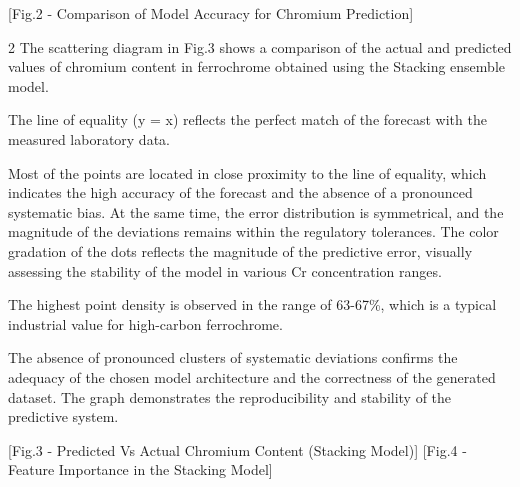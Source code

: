 [Fig.2 - Comparison of Model Accuracy for Chromium Prediction]

\begin{multicols}{2}
The scattering diagram in Fig.3 shows a comparison of the actual and
predicted values of chromium content in ferrochrome obtained using the
Stacking ensemble model.

The line of equality (y = x) reflects the perfect match of the forecast
with the measured laboratory data.

Most of the points are located in close proximity to the line of
equality, which indicates the high accuracy of the forecast and the
absence of a pronounced systematic bias. At the same time, the error
distribution is symmetrical, and the magnitude of the deviations remains
within the regulatory tolerances. The color gradation of the dots
reflects the magnitude of the predictive error, visually assessing the
stability of the model in various Cr concentration ranges.

The highest point density is observed in the range of 63-67\%, which is
a typical industrial value for high-carbon ferrochrome.

The absence of pronounced clusters of systematic deviations confirms the
adequacy of the chosen model architecture and the correctness of the
generated dataset. The graph demonstrates the reproducibility and
stability of the predictive system.
\end{multicols}

[Fig.3 - Predicted Vs Actual Chromium Content (Stacking Model)]
[Fig.4 - Feature Importance in the Stacking Model]

